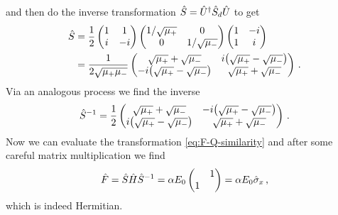         and then do the inverse transformation $\hat{S} = \hat{U}^\dag \hat{S}_d \hat{U}$ to get
        \begin{align*}
            \hS &= \frac{1}{2}\pmqty{1 & 1 \\ i & -i}  \pmqty{\dmat[0]{1/\sqrt{\mu_{+}}, 1/\sqrt{\mu_{-}}}} \pmqty{1 & -i \\ 1 & i} \\
            &= \frac{1}{2\sqrt{\mu_{+}\mu_{-}}} \pmqty{\admat[\sqrt{\mu_{+}} + \sqrt{\mu_{-}}]{i\pqty{\sqrt{\mu_{+}} - \sqrt{\mu_{-}}} , -i\pqty{\sqrt{\mu_{+}} - \sqrt{\mu_{-}}}}}
            \myperiod
        \end{align*}
        Via an analogous process we find the inverse
        \begin{align*}
            \hS^{-1} = \frac{1}{2} \pmqty{\admat[\sqrt{\mu_{+}} + \sqrt{\mu_{-}}]{-i\pqty{\sqrt{\mu_{+}} - \sqrt{\mu_{-}}} , i\pqty{\sqrt{\mu_{+}} - \sqrt{\mu_{-}}}}}
            \myperiod
        \end{align*}
        Now we can evaluate the transformation \eqref{eq:F-Q-similarity} and after some careful matrix multiplication we find 
        \begin{equation*}
            \hF = \hS \hH \hS^{-1}
            = \alpha E_0 \pmqty{\admat{1,1}}
            = \alpha E_0 \togglehat{\sigma}_x
            \mycomma
        \end{equation*}
        which is indeed Hermitian.
        
